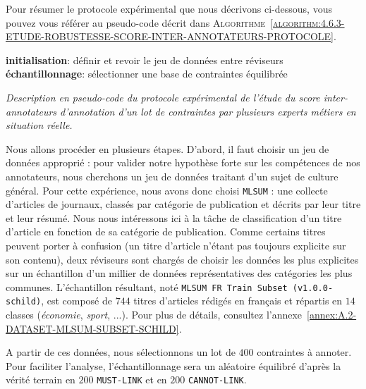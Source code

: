 			Pour résumer le protocole expérimental que nous décrivons ci-dessous, vous pouvez vous référer au pseudo-code décrit dans \textsc{Algorithme~\ref{algorithm:4.6.3-ETUDE-ROBUSTESSE-SCORE-INTER-ANNOTATEURS-PROTOCOLE}}.

			\begin{algorithm}
				\textbf{initialisation}: définir et revoir le jeu de données entre réviseurs \;
				\textbf{échantillonnage}: sélectionner une base de contraintes équilibrée \;
				\caption{\textit{
					Description en pseudo-code du protocole expérimental de l'étude du score inter-annotateurs d'annotation d'un lot de contraintes par plusieurs experts métiers en situation réelle.
				}}
				\label{algorithm:4.6.3-ETUDE-ROBUSTESSE-SCORE-INTER-ANNOTATEURS-PROTOCOLE}
			\end{algorithm}
			
			Nous allons procéder en plusieurs étapes.
			D'abord, il faut choisir un jeu de données approprié : pour valider notre hypothèse forte sur les compétences de nos annotateurs, nous cherchons un jeu de données traitant d'un sujet de culture général.
			Pour cette expérience, nous avons donc choisi \texttt{MLSUM} : une collecte d'articles de journaux, classés par catégorie de publication et décrits par leur titre et leur résumé.
			Nous nous intéressons ici à la tâche de classification d'un titre d'article en fonction de sa catégorie de publication.
			Comme certains titres peuvent porter à confusion (un titre d'article n'étant pas toujours explicite sur son contenu), deux réviseurs sont chargés de choisir les données les plus explicites sur un échantillon d'un millier de données représentatives des catégories les plus communes.
			L'échantillon résultant, noté \texttt{MLSUM FR Train Subset (v1.0.0-schild)}, est composé de $744$ titres d'articles rédigés en français et répartis en $14$ classes (\textit{économie}, \textit{sport}, ...).
			Pour plus de détails, consultez l'annexe~\ref{annex:A.2-DATASET-MLSUM-SUBSET-SCHILD}.
		
			A partir de ces données, nous sélectionnons un lot de $400$ contraintes à annoter.
			Pour faciliter l'analyse, l'échantillonnage sera un aléatoire équilibré d'après la vérité terrain en $200$ \texttt{MUST-LINK} et en $200$ \texttt{CANNOT-LINK}.
			
